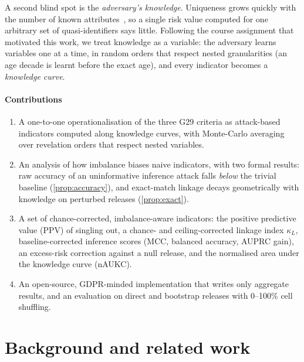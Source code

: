 \documentclass[preprint,12pt]{elsarticle}
\newcommand{\kL}{\kappa_{L}}
\newcommand{\G}{G29}
\begin{document}
A second blind spot is the \emph{adversary's knowledge}. Uniqueness grows quickly with the number of known attributes~\cite{sweeney2002kanon,rocher2019estimating}, so a single risk value computed for one arbitrary set of quasi-identifiers says little. Following the course assignment that motivated this work, we treat knowledge as a variable: the adversary learns variables one at a time, in random orders that respect nested granularities (an age decade is learnt before the exact age), and every indicator becomes a \emph{knowledge curve}.

\paragraph{Contributions}
\begin{enumerate}
\item A one-to-one operationalisation of the three \G{} criteria as attack-based indicators computed along knowledge curves, with Monte-Carlo averaging over revelation orders that respect nested variables.
\item An analysis of how imbalance biases naive indicators, with two formal results: raw accuracy of an uninformative inference attack falls \emph{below} the trivial baseline (\cref{prop:accuracy}), and exact-match linkage decays geometrically with knowledge on perturbed releases (\cref{prop:exact}).
\item A set of chance-corrected, imbalance-aware indicators: the positive predictive value (PPV) of singling out, a chance- and ceiling-corrected linkage index $\kL$, baseline-corrected inference scores (MCC, balanced accuracy, AUPRC gain), an excess-risk correction against a null release, and the normalised area under the knowledge curve (nAUKC).
\item An open-source, GDPR-minded implementation that writes only aggregate results, and an evaluation on direct and bootstrap releases with 0--100\% cell shuffling.
\end{enumerate}

\section{Background and related work}
\label{sec:related}
\end{document}
